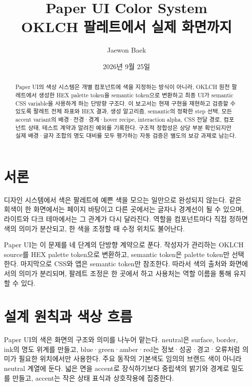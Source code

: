 \documentclass[11pt,titlepage]{article}
\title{Paper UI Color System\\[0.4em]
\large OKLCH 팔레트에서 실제 화면까지}
\author{Jaewon Baek}
\date{2026년 9월 25일}
\begin{document}
\hypersetup{pageanchor=false}
\maketitle
\hypersetup{pageanchor=true}

\newpage
\begin{abstract}
Paper UI의 색상 시스템은 개별 컴포넌트에 색을 지정하는 방식이 아니라, OKLCH 원천 팔레트에서 생성한 HEX palette token을 semantic token으로 변환하고 최종 UI가 semantic CSS variable을 사용하게 하는 단방향 구조다. 이 보고서는 현재 구현을 재현하고 검증할 수 있도록 팔레트 전체 좌표와 HEX 결과, 생성 알고리즘, semantic의 정확한 step 선택, 모든 accent variant의 배경·전경·경계·hover recipe, interaction alpha, CSS 전달 경로, 컴포넌트 상태, 테스트 계약과 알려진 예외를 기록한다. 구조적 정합성은 상당 부분 확인되지만 실제 배경·글자 조합의 명도 대비를 모두 평가하는 자동 검증은 별도의 보강 과제로 남는다.
\end{abstract}

\newpage
\renewcommand{\contentsname}{목차}
\tableofcontents
\newpage

\section{서론}

디자인 시스템에서 색은 팔레트에 예쁜 색을 모으는 일만으로 완성되지 않는다. 같은 회색이 한 화면에서는 페이지 바탕이고 다른 곳에서는 글자나 경계선이 될 수 있으며, 라이트와 다크 테마에서는 그 관계가 다시 달라진다. 역할을 컴포넌트마다 직접 정하면 색의 의미가 분산되고, 한 색을 조정할 때 수정 위치도 불어난다.

Paper UI는 이 문제를 네 단계의 단방향 계약으로 푼다. 작성자가 관리하는 OKLCH source를 HEX palette token으로 변환하고, semantic token은 palette token만 선택한다. 마지막으로 CSS와 앱은 semantic token만 참조한다. 따라서 색의 출처와 화면에서의 의미가 분리되며, 팔레트 조정은 한 곳에서 하고 사용처는 역할 이름을 통해 유지할 수 있다\cite{architecture,palette,ladder,semantics}.

\section{설계 원칙과 색상 흐름}

Paper UI의 색은 화면의 구조와 의미를 나누어 맡는다. neutral은 surface, border, ink의 명도 위계를 만들고, blue·green·amber·red는 정보·성공·경고·오류처럼 의미가 필요한 위치에서만 사용한다. 주요 동작의 기본색도 임의의 브랜드 색이 아니라 neutral 계열에 둔다. 넓은 면을 accent로 장식하기보다 중립색의 밝기와 경계로 밀도를 만들고, accent는 작은 상태 표식과 상호작용에 집중한다\cite{tokensdoc}.
\end{document}
